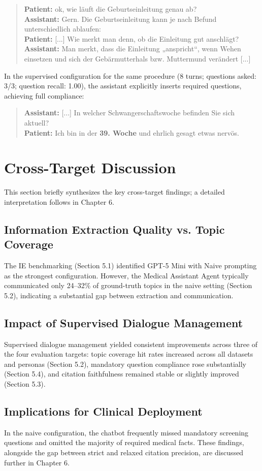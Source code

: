 \begin{quote}
\textbf{Patient:} ok, wie läuft die Geburtseinleitung genau ab? \\
\textbf{Assistant:} Gern. Die Geburtseinleitung kann je nach Befund unterschiedlich ablaufen: \\
\textbf{Patient:} [...] Wie merkt man denn, ob die Einleitung gut anschlägt? \\
\textbf{Assistant:} Man merkt, dass die Einleitung „anspricht“, wenn Wehen einsetzen und sich der Gebärmutterhals bzw. Muttermund verändert [...]
\end{quote}

In the supervised configuration for the same procedure (8 turns; questions asked: 3/3; question recall: 1.00), the assistant explicitly inserts required questions, achieving full compliance:

\begin{quote}
\textbf{Assistant:} [...] In welcher Schwangerschaftswoche befinden Sie sich aktuell? \\
\textbf{Patient:} Ich bin in der \textbf{39. Woche} und ehrlich gesagt etwas nervös.
\end{quote}

\section{Cross-Target Discussion}

This section briefly synthesizes the key cross-target findings; a detailed interpretation follows in Chapter 6.

\subsection{Information Extraction Quality vs. Topic Coverage}

The IE benchmarking (Section 5.1) identified GPT-5 Mini with Naive prompting as the strongest configuration. However, the Medical Assistant Agent typically communicated only 24--32\% of ground-truth topics in the naive setting (Section 5.2), indicating a substantial gap between extraction and communication.

\subsection{Impact of Supervised Dialogue Management}

Supervised dialogue management yielded consistent improvements across three of the four evaluation targets: topic coverage hit rates increased across all datasets and personas (Section 5.2), mandatory question compliance rose substantially (Section 5.4), and citation faithfulness remained stable or slightly improved (Section 5.3).

\subsection{Implications for Clinical Deployment}

In the naive configuration, the chatbot frequently missed mandatory screening questions and omitted the majority of required medical facts. These findings, alongside the gap between strict and relaxed citation precision, are discussed further in Chapter 6.
